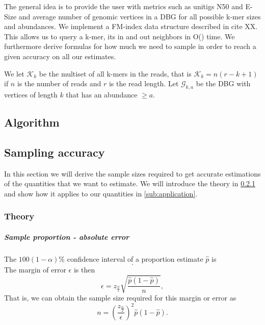 \documentclass[a4paper,6pt]{article}
\begin{document}
The general idea is to provide the user with metrics such as unitigs N50 and E-Size and average number of genomic vertices in a DBG  for all possible k-mer sizes and abundances. {\color{red} We implement a FM-index data structure described in cite XX. This allows us to query a k-mer, its in and out neighbors in O() time. }  We furthermore derive formulas for how much we need to sample in order to reach a given accuracy on all our estimates. 

We let $\mathcal{K}_k$ be the multiset of all k-mers in the reads, that is $\mathcal{K}_k = n(r-k+1)$ if $n$ is the number of reads and $r$ is the read length. Let $\mathcal{G}_{k,a}$ be the DBG with vertices of length $k$ that has an abundance $\geq a$.

\subsection{Algorithm} %
\label{sub:algorithm}


\subsection{Sampling accuracy}

In this section we will derive the sample sizes required to get accurate estimations of the quantities that we want to estimate. We will introduce the theory in \ref{ssub:theory} and show how it applies to our quantities in \ref{sub:application}. 


\subsubsection{Theory} %
\label{ssub:theory}


\subparagraph{Sample proportion - absolute error} %
\label{subp:sample_proportion}
The $100(1-\alpha)\%$ confidence interval of a proportion estimate $\hat{p}$ is 
\begin{equation*}
	[\hat{p} - z_{\frac{\alpha}{2}}\sqrt{\frac{\hat{p}(1-\hat{p})}{n}}, \hat{p} + z_{\frac{\alpha}{2}}\sqrt{\frac{\hat{p}(1-\hat{p})}{n}} ].
\end{equation*}
The margin of error $\epsilon$ is then
\begin{equation*}
	\epsilon = z_{\frac{\alpha}{2}}\sqrt{\frac{\hat{p}(1-\hat{p})}{n}},
\end{equation*}
That is, we can obtain the sample size required for this margin or error as 
\begin{equation}
	n = (\frac{z_{\frac{\alpha}{2}}}{\epsilon})^2\hat{p}(1-\hat{p}).
\end{equation}
\end{document}

